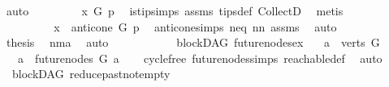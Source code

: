 \begin{isabellebody}
\ auto\isanewline
\ \ \ \ \ \ \isamarkupfalse%
\ {\isachardoublequoteopen}{\isasymnot}\ x\ {\isasymrightarrow}\isactrlsup {\isacharplus}{\kern0pt}\isactrlbsub G\isactrlesub \ p{\isachardoublequoteclose}\ \isamarkupfalse%
\ is{\isacharunderscore}{\kern0pt}tip{\isachardot}{\kern0pt}simps\ assms\ tips{\isacharunderscore}{\kern0pt}def\ CollectD\ \isamarkupfalse%
\ metis\ \ \ \ \ \ \ \ \ \ \isanewline
\ \ \ \ \ \ \isamarkupfalse%
\ \isamarkupfalse%
\ {\isachardoublequoteopen}x\ {\isasymin}\ anticone\ G\ p{\isachardoublequoteclose}\ \isamarkupfalse%
\ anticone{\isachardot}{\kern0pt}simps\ neq\ nn\ assms{\isacharparenleft}{\kern0pt}{}{\isacharparenright}{\kern0pt}\ \isamarkupfalse%
\ auto\isanewline
\ \ \ \ \ \ \isamarkupfalse%
\ \isamarkupfalse%
\ {\isacharquery}{\kern0pt}thesis\ \isamarkupfalse%
\ nma\ \isamarkupfalse%
\ auto\ \ \isanewline
\ \ \ \ \isamarkupfalse%
\isanewline
\ \ \isamarkupfalse%
\isanewline
{}\isamarkupfalse%
%
\endisatagproof
{\isafoldproof}%
%
\isadelimproof
%
\endisadelimproof
%
\isadelimdocument
%
\endisadelimdocument
%
\isatagdocument
%
\isamarkuptrue%
%
\endisatagdocument
{\isafolddocument}%
%
\isadelimdocument
%
\endisadelimdocument
{}\isamarkupfalse%
\ {\isacharparenleft}{\kern0pt}\ blockDAG{\isacharparenright}{\kern0pt}\ future{\isacharunderscore}{\kern0pt}nodes{\isacharunderscore}{\kern0pt}ex{\isacharcolon}{\kern0pt}\isanewline
\ \ \ {\isachardoublequoteopen}a\ {\isasymin}\ verts\ G{\isachardoublequoteclose}\isanewline
\ \ \ {\isachardoublequoteopen}a\ {\isasymnotin}\ future{\isacharunderscore}{\kern0pt}nodes\ G\ a{\isachardoublequoteclose}\isanewline
%
\isadelimproof
\ \ %
\endisadelimproof
%
\isatagproof
{}\isamarkupfalse%
\ cycle{\isacharunderscore}{\kern0pt}free\ future{\isacharunderscore}{\kern0pt}nodes{\isachardot}{\kern0pt}simps\ reachable{\isacharunderscore}{\kern0pt}def\ \isamarkupfalse%
\ auto%
\endisatagproof
{\isafoldproof}%
%
\isadelimproof
%
\endisadelimproof
%
\isadelimdocument
%
\endisadelimdocument
%
\isatagdocument
%
\isamarkuptrue%
%
\endisatagdocument
{\isafolddocument}%
%
\isadelimdocument
%
\endisadelimdocument
{}\isamarkupfalse%
\ {\isacharparenleft}{\kern0pt}\ blockDAG{\isacharparenright}{\kern0pt}\ reduce{\isacharunderscore}{\kern0pt}past{\isacharunderscore}{\kern0pt}not{\isacharunderscore}{\kern0pt}empty{\isacharcolon}{\kern0pt}\isanewline

\end{isabellebody}
